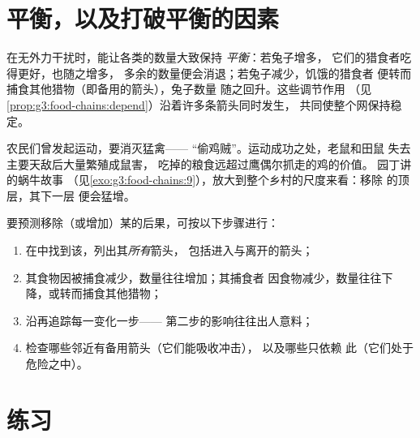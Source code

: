\section{平衡，以及打破平衡的因素}

\begin{proposition}[食物网的平衡]\label{prop:g5:food-webs:balance}
在无外力干扰时，能让各类的数量大致保持
\emph{平衡}：若兔子增多，
它们的猎食者吃得更好，也随之增多，
多余的数量便会消退；若兔子减少，饥饿的猎食者
便转而捕食其他猎物（即备用的箭头），兔子数量
随之回升。这些调节作用
（见\cref{prop:g3:food-chains:depend}）沿着许多条箭头同时发生，
共同使整个网保持稳定。
\end{proposition}
\admitted

\begin{example}[经典的错误]\label{ex:g5:food-webs:mistake}
农民们曾发起运动，要消灭猛禽——
“偷鸡贼”。运动成功之处，老鼠和田鼠
失去主要天敌后大量繁殖成鼠害，
吃掉的粮食远超过鹰偶尔抓走的鸡的价值。
园丁讲的蜗牛故事
（见\cref{exo:g3:food-chains:9}），放大到整个乡村的尺度来看：移除
的顶层，其下一层
便会猛增。
\end{example}

\begin{method}[预测扰动的影响]\label{met:g5:food-webs:predict}
要预测移除（或增加）某的后果，可按以下步骤进行：
\begin{enumerate}
  \item 在中找到该，列出其\emph{所有}箭头，
        包括进入与离开的箭头；
  \item 其食物因被捕食减少，数量往往增加；其捕食者
        因食物减少，数量往往下降，或转而捕食其他猎物；
  \item 沿再追踪每一变化一步——
        第二步的影响往往出人意料；
  \item 检查哪些邻近有备用箭头（它们能吸收冲击），
        以及哪些只依赖
        此（它们处于危险之中）。
\end{enumerate}
\end{method}

\section{练习}

